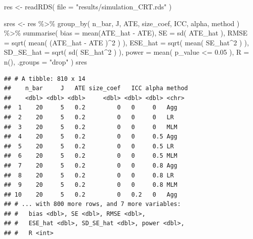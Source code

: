 \documentclass[
]{book}
\newenvironment{Shaded}{\begin{snugshade}}{\end{snugshade}}
\newcommand{\AttributeTok}[1]{\textcolor[rgb]{0.77,0.63,0.00}{#1}}
\newcommand{\DecValTok}[1]{\textcolor[rgb]{0.00,0.00,0.81}{#1}}
\newcommand{\FloatTok}[1]{\textcolor[rgb]{0.00,0.00,0.81}{#1}}
\newcommand{\FunctionTok}[1]{\textcolor[rgb]{0.00,0.00,0.00}{#1}}
\newcommand{\NormalTok}[1]{#1}
\newcommand{\OtherTok}[1]{\textcolor[rgb]{0.56,0.35,0.01}{#1}}
\newcommand{\SpecialCharTok}[1]{\textcolor[rgb]{0.00,0.00,0.00}{#1}}
\newcommand{\StringTok}[1]{\textcolor[rgb]{0.31,0.60,0.02}{#1}}
\begin{document}
\begin{Shaded}
\begin{Highlighting}[]
\NormalTok{res }\OtherTok{\textless{}{-}} \FunctionTok{readRDS}\NormalTok{( }\AttributeTok{file =} \StringTok{"results/simulation\_CRT.rds"}\NormalTok{ )}

\NormalTok{sres }\OtherTok{\textless{}{-}} 
\NormalTok{  res }\SpecialCharTok{\%\textgreater{}\%} 
  \FunctionTok{group\_by}\NormalTok{( n\_bar, J, ATE, size\_coef, ICC, alpha, method ) }\SpecialCharTok{\%\textgreater{}\%}
  \FunctionTok{summarise}\NormalTok{( }
    \AttributeTok{bias =} \FunctionTok{mean}\NormalTok{(ATE\_hat }\SpecialCharTok{{-}}\NormalTok{ ATE),}
    \AttributeTok{SE =} \FunctionTok{sd}\NormalTok{( ATE\_hat ),}
    \AttributeTok{RMSE =} \FunctionTok{sqrt}\NormalTok{( }\FunctionTok{mean}\NormalTok{( (ATE\_hat }\SpecialCharTok{{-}}\NormalTok{ ATE )}\SpecialCharTok{\^{}}\DecValTok{2}\NormalTok{ ) ),}
    \AttributeTok{ESE\_hat =} \FunctionTok{sqrt}\NormalTok{( }\FunctionTok{mean}\NormalTok{( SE\_hat}\SpecialCharTok{\^{}}\DecValTok{2}\NormalTok{ ) ),}
    \AttributeTok{SD\_SE\_hat =} \FunctionTok{sqrt}\NormalTok{( }\FunctionTok{sd}\NormalTok{( SE\_hat}\SpecialCharTok{\^{}}\DecValTok{2}\NormalTok{ ) ),}
    \AttributeTok{power =} \FunctionTok{mean}\NormalTok{( p\_value }\SpecialCharTok{\textless{}=} \FloatTok{0.05}\NormalTok{ ),}
    \AttributeTok{R =} \FunctionTok{n}\NormalTok{(),}
    \AttributeTok{.groups =} \StringTok{"drop"}
\NormalTok{  )}
\NormalTok{sres}
\end{Highlighting}
\end{Shaded}

\begin{verbatim}
## # A tibble: 810 x 14
##    n_bar     J   ATE size_coef   ICC alpha method
##    <dbl> <dbl> <dbl>     <dbl> <dbl> <dbl> <chr> 
##  1    20     5   0.2         0   0     0   Agg   
##  2    20     5   0.2         0   0     0   LR    
##  3    20     5   0.2         0   0     0   MLM   
##  4    20     5   0.2         0   0     0.5 Agg   
##  5    20     5   0.2         0   0     0.5 LR    
##  6    20     5   0.2         0   0     0.5 MLM   
##  7    20     5   0.2         0   0     0.8 Agg   
##  8    20     5   0.2         0   0     0.8 LR    
##  9    20     5   0.2         0   0     0.8 MLM   
## 10    20     5   0.2         0   0.2   0   Agg   
## # ... with 800 more rows, and 7 more variables:
## #   bias <dbl>, SE <dbl>, RMSE <dbl>,
## #   ESE_hat <dbl>, SD_SE_hat <dbl>, power <dbl>,
## #   R <int>
\end{verbatim}
\end{document}
